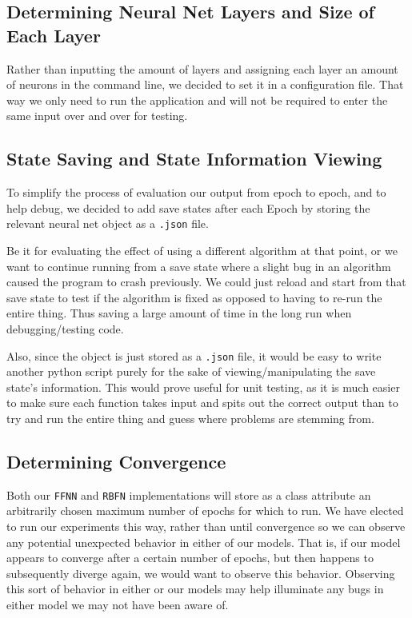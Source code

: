 \documentclass{article}
\begin{document}
\subsection*{Determining Neural Net Layers and Size of Each Layer}

Rather than inputting the amount of layers and assigning each layer an amount of neurons in the command line, we decided to set it in a configuration file. That way we only need to run the application and will not be required to enter the same input over and over for testing.

\subsection*{State Saving and State Information Viewing}
To simplify the process of evaluation our output from epoch to epoch, and to help debug, we decided to add save states after each Epoch by storing the relevant neural net object as a \texttt{.json} file. 

Be it for evaluating the effect of using a different algorithm at that point, or we want to continue running from a save state where a slight bug in an algorithm caused the program to crash previously. We could just reload and start from that save state to test if the algorithm is fixed as opposed to having to re-run the entire thing. Thus saving a large amount of time in the long run when debugging/testing code.

Also, since the object is just stored as a \texttt{.json} file, it would be easy to write another python script purely for the sake of viewing/manipulating the save state's information. This would prove useful for unit testing, as it is much easier to make sure each function takes input and spits out the correct output than to try and run the entire thing and guess where problems are stemming from.

\subsection*{Determining Convergence}
Both our \texttt{FFNN} and \texttt{RBFN} implementations will store as a class attribute an arbitrarily chosen maximum number of epochs for which to run. We have elected to run our experiments this way, rather than until convergence so we can observe any potential unexpected behavior in either of our models. That is, if our model appears to converge after a certain number of epochs, but then happens to subsequently diverge again, we would want to observe this behavior. Observing this sort of behavior in either or our models may help illuminate any bugs in either model we may not have been aware of.
\end{document}
